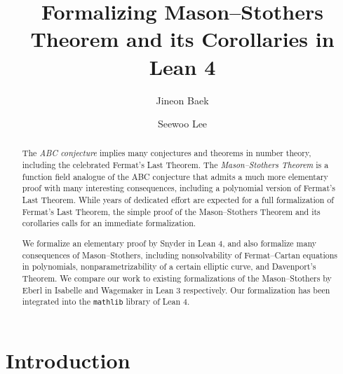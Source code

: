 \documentclass[runningheads]{llncs}
\begin{document}
%
\title{Formalizing Mason--Stothers Theorem and its Corollaries in Lean 4}
%
\author{Jineon Baek \and
Seewoo Lee}
%
%
\maketitle              %
%
\begin{abstract}


The \emph{ABC conjecture} implies many conjectures and theorems in number theory, including the celebrated Fermat's Last Theorem.
The \emph{Mason--Stothers Theorem} is a function field analogue of the ABC conjecture that admits a much more elementary proof with many interesting consequences,
including a polynomial version of Fermat's Last Theorem.
While years of dedicated effort are expected for a full formalization of  
Fermat's Last Theorem, the simple proof of the Mason--Stothers Theorem and its corollaries calls for an immediate formalization.

We formalize an elementary proof by Snyder in Lean 4, and also formalize many consequences of Mason--Stothers, including nonsolvability of Fermat--Cartan equations in polynomials, nonparametrizability of a certain elliptic curve, and Davenport's Theorem.
We compare our work to existing formalizations of the Mason--Stothers by Eberl in Isabelle and Wagemaker in Lean 3 respectively.
Our formalization has been integrated into the \texttt{mathlib} library of Lean 4.

\end{abstract}
%
%
%

\section{Introduction}\label{sec:1}
\end{document}
